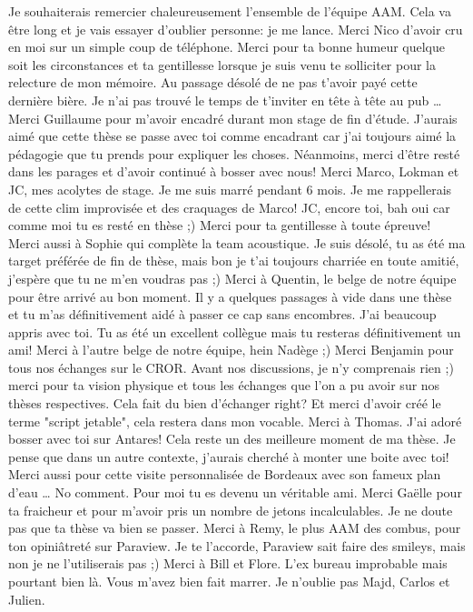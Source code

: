 Je souhaiterais remercier chaleureusement
l'ensemble de l'équipe AAM. Cela va être long et je vais
essayer d'oublier personne: je me lance. 
Merci Nico d'avoir cru en moi sur un simple coup
de téléphone. Merci pour ta bonne humeur quelque soit les
circonstances et ta gentillesse lorsque je suis venu te solliciter
pour la relecture de mon mémoire. Au passage désolé de ne pas
t'avoir payé cette dernière bière. Je n'ai pas trouvé le temps de t'inviter
en tête à tête au pub \ldots{} Merci Guillaume pour m'avoir encadré
durant mon stage de fin d'étude. J'aurais aimé que cette thèse se passe avec toi comme
encadrant car j'ai toujours aimé la pédagogie que
tu prends pour expliquer les choses. 
Néanmoins, merci d'être resté dans les parages et d'avoir
continué à bosser avec nous!
Merci Marco, Lokman
et JC, mes acolytes de stage. Je me suis marré pendant 6 mois.
Je me rappellerais de cette clim improvisée et des craquages de Marco!
JC, encore toi, bah oui car comme moi tu es resté en thèse ;)
Merci pour ta gentillesse à toute épreuve! Merci aussi à Sophie qui complète
la team acoustique. Je suis désolé, tu as été ma target préférée
de fin de thèse, mais bon je t'ai toujours charriée en toute amitié,
j'espère que tu ne m'en voudras pas ;)
Merci à Quentin, le belge de notre équipe pour être arrivé au bon moment.
Il y a quelques passages à vide dans une thèse et tu m'as définitivement
aidé à passer ce cap sans encombres.
J'ai beaucoup appris avec toi. Tu as été un excellent collègue
mais tu resteras définitivement un ami!
Merci à l'autre belge de notre équipe, hein Nadège ;)
Merci Benjamin
pour tous nos échanges sur le CROR. Avant nos discussions, je n'y
comprenais rien ;) merci pour ta vision physique et tous les échanges
que l'on a pu avoir sur nos thèses respectives. Cela fait du bien
d'échanger right? Et merci d'avoir créé le terme "script jetable",
cela restera dans mon vocable. Merci à Thomas. J'ai adoré bosser avec
toi sur Antares! Cela reste un des meilleure moment
de ma thèse. Je pense que dans un autre contexte, j'aurais cherché à
monter une boite avec toi! Merci aussi pour cette visite personnalisée
de Bordeaux avec son fameux plan d'eau \ldots{} No comment. Pour moi tu es
devenu un véritable ami. Merci Gaëlle
pour ta fraicheur et pour m'avoir pris un nombre de jetons incalculables.
Je ne doute pas que ta thèse va bien se passer.
Merci à Remy, le plus AAM des combus, pour ton opiniâtreté sur Paraview.
Je te l'accorde, Paraview sait faire des smileys, 
mais non je ne l'utiliserais pas ;)
Merci à Bill et Flore. L'ex bureau improbable mais pourtant
bien là. Vous m'avez bien fait marrer. Je n'oublie pas Majd, Carlos et Julien.
